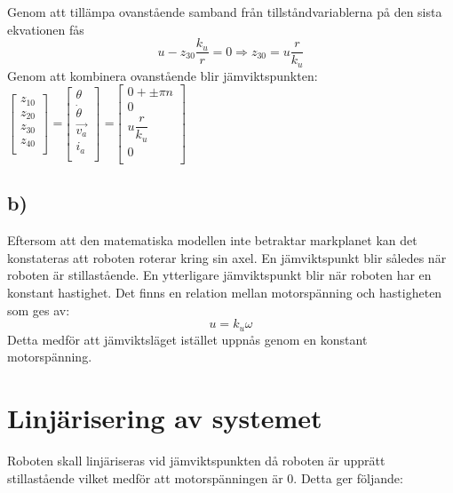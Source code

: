 \documentclass[11pt]{article}
\begin{document}
Genom att tillämpa ovanstående samband från tillståndvariablerna på den sista ekvationen fås
\begin{equation*}
u-z_{30}\dfrac{k_u}{r} =0 \Rightarrow z_{30} = u\dfrac{r}{k_u}
\end{equation*}
Genom att kombinera ovanstående blir jämviktspunkten:\\[1em]
$
\begin{bmatrix}
z_{10}\\
z_{20}\\
z_{30}\\
z_{40}\\
\end{bmatrix}
$
=$
\begin{bmatrix}
\theta\\
\dot{\theta}\\
\overrightarrow{v_a}\\
i_a\\
\end{bmatrix}
$
=$
\begin{bmatrix}
0+\pm \pi n\\
0\\
u\dfrac{r}{k_u}\\
0\\
\end{bmatrix}
$
\subsection{b)}
Eftersom att den matematiska modellen inte betraktar markplanet kan det konstateras att roboten roterar kring sin axel. En jämviktspunkt blir således när roboten är stillastående. En ytterligare jämviktspunkt blir när roboten har en konstant hastighet. Det finns en relation mellan motorspänning och hastigheten som ges av:
\begin{equation*}
u = k_u\omega
\end{equation*}
Detta medför att jämviktsläget istället uppnås genom en konstant motorspänning. \newpage
\section{Linjärisering av systemet}
Roboten skall linjäriseras vid jämviktspunkten då roboten är upprätt stillastående vilket medför att motorspänningen är 0. Detta ger följande: \\[1em]
\end{document}
